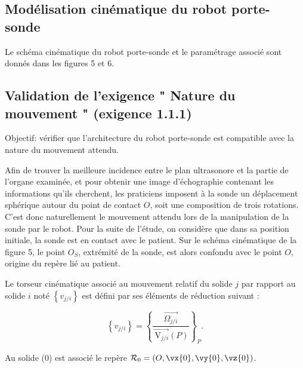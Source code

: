 \subsection*{Modélisation cinématique du robot porte-sonde}
Le schéma cinématique du robot porte-sonde et le paramétrage associé sont donnés dans les figures 5 et 6.

\subsection*{Validation de l'exigence " Nature du mouvement " (exigence 1.1.1)}
Objectif: vérifier que l'architecture du robot porte-sonde est compatible avec la nature du mouvement attendu.

Afin de trouver la meilleure incidence entre le plan ultrasonore et la partie de l'organe examinée, et pour obtenir une image d'échographie contenant les informations qu'ils cherchent, les praticiens imposent à la sonde un déplacement sphérique autour du point de contact $O$, soit une composition de trois rotations. C'est donc naturellement le mouvement attendu lors de la manipulation de la sonde par le robot. Pour la suite de l'étude, on considère que dans sa position initiale, la sonde est en contact avec le patient. Sur le schéma cinématique de la figure 5, le point $O_{S}$, extrémité de la sonde, est alors confondu avec le point $O$, origine du repère lié au patient.

Le torseur cinématique associé au mouvement relatif du solide $j$ par rapport au solide $i$ noté $\left\{v_{j / i}\right\}$ est défini par ses éléments de réduction suivant :

$$
\left\{v_{j / i}\right\}=\left\{\frac{\overrightarrow{\Omega_{j / i}}}{\overrightarrow{\mathrm{~V}_{j / i}}(P)}\right\}_{P} .
$$


Au solide (0) est associé le repère $\mathcal{R}_{0}=\left(O,\vx{0},\vy{0},\vz{0}\right)$.

